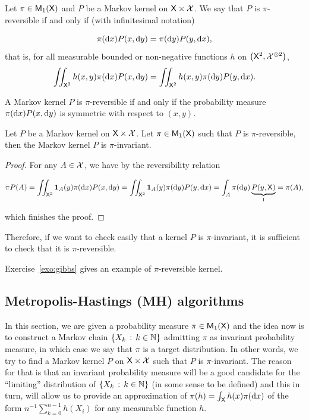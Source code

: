 \documentclass[english,graybox,envcountchap,envcountsame,sectrefs,shortlabels]{svmono}
\theoremstyle{style}
\newenvironment{svmultproof}{\small \begin{proof}}{\end{proof}}
\newcommand{\bs}{\begin{shaded}}
\newcommand{\es}{\end{shaded}}
\begin{document}
\bs
\begin{definition}
Let $\pi\in\mathsf{M}_{1}(\mathsf{X})$ and $P$ be a Markov kernel on $\mathsf{X}\times\mathcal{X}$.
We say that $P$ is $\pi$-reversible if and only if (with infinitesimal
notation)

\begin{equation}
\pi(\mathrm{d} x)P(x,\mathrm{d} y)=\pi(\mathrm{d} y)P(y,\mathrm{d} x),\label{eq:reversibility}
\end{equation}
that is, for all measurable bounded or non-negative functions $h$
on $\left(\mathsf{X}^{2},\mathcal{X}^{\otimes2}\right)$,
\begin{equation}
\iint_{\mathsf{X}^{2}}h(x,y)\pi(\mathrm{d} x)P(x,\mathrm{d} y)=\iint_{\mathsf{X}^{2}}h(x,y)\pi(\mathrm{d} y)P(y,\mathrm{d} x).\label{eq:reversibility:h}
\end{equation}
\end{definition}
\es A Markov kernel $P$ is $\pi$-reversible if and only
if the probability measure $\pi(\mathrm{d} x)P(x,\mathrm{d} y)$ is symmetric
with respect to $(x,y)$. \bs
\begin{proposition}
Let $P$ be a Markov kernel on $\mathsf{X}\times\mathcal{X}$. Let $\pi\in\mathsf{M}_{1}(\mathsf{X})$
such that $P$ is $\pi$-reversible, then the Markov kernel $P$ is
$\pi$-invariant.
\end{proposition}
\es
\begin{svmultproof}
For any $A\in\mathcal{X}$, we have by the reversibility relation

\[
\pi P(A)=\iint_{\mathsf{X}^{2}}\mathbf{1}_{A}(y)\pi(\mathrm{d} x)P(x,\mathrm{d} y)=\iint_{\mathsf{X}^{2}}\mathbf{1}_{A}(y)\pi(\mathrm{d} y)P(y,\mathrm{d} x)=\int_{A}\pi(\mathrm{d} y)\underbrace{P(y,\mathsf{X})}_{1}=\pi(A),
\]

which finishes the proof.
\end{svmultproof}


Therefore, if we want to check easily that
a kernel $P$ is $\pi$-invariant, it is sufficient to check that
it is $\pi$-reversible.


Exercise~\ref{exo:gibbs} gives an example of $\pi$-reversible kernel.

\subsection{Metropolis-Hastings (MH) algorithms}
\label{sec:MH}
In this section, we are given a probability measure $\pi\in\mathsf{M}_{1}(\mathsf{X})$
and the idea now is to construct a Markov chain $\left\{ X_{k}\,:\,k\in\mathbb{N}\right\}$
admitting $\pi$ as invariant probability measure, in which case we
say that $\pi$ is a target distribution. In other words, we try to
find a Markov kernel $P$ on $\mathsf{X}\times\mathcal{X}$ such that $P$
is $\pi$-invariant. The reason for that is that an invariant probability
measure will be a good candidate for the ``limiting'' distribution
of $\left\{ X_{k}\,:\,k\in\mathbb{N}\right\}$ (in some sense to be defined) and this
in turn, will allow us to provide an approximation of $\pi(h)=\int_{\mathsf{X}}h(x)\pi(\mathrm{d} x)$ of the form $n^{-1}\sum_{k=0}^{n-1}h(X_{i})$ for any measurable function $h$. 
\end{document}

